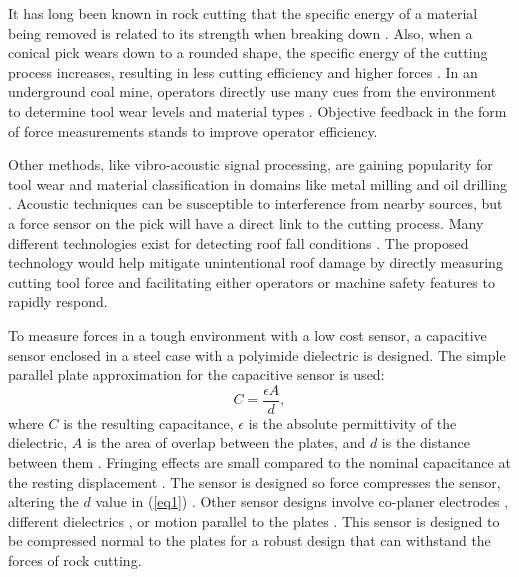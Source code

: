 It has long been known in rock cutting that the specific energy of a material being removed 
is related to its strength when breaking down \cite{TEALE196557}.
Also, when a conical pick wears down to a rounded shape, the specific energy of the cutting process
increases, resulting in less cutting efficiency and higher forces \cite{Zeng2021}.
In an underground coal mine, operators directly use many cues 
from the environment to determine tool wear levels and material types \cite{Bartels2009}.
Objective feedback in the form of force measurements stands to improve operator efficiency.

Other methods, like vibro-acoustic signal processing, 
are gaining popularity for tool wear and material classification 
in domains like metal milling \cite{Cooper2020} and oil drilling \cite{Wang2023}.
Acoustic techniques can be susceptible to interference from nearby sources, 
but a force sensor on the pick will have a direct link to the cutting process.
Many different technologies exist for detecting 
roof fall conditions \cite{en15218312, SLAKER201783, alzahrani2017detection}.
The proposed technology would help mitigate unintentional roof damage by directly measuring
cutting tool force and facilitating either operators or machine safety features
to rapidly respond.

To measure forces in a tough environment with a low cost sensor, 
a capacitive sensor enclosed in a steel case with a polyimide dielectric is designed. 
The simple parallel plate approximation for the capacitive sensor is used:
\begin{equation}
\label{eq1}
C = \frac{\epsilon A}{d},
\end{equation}
where $C$ is the resulting capacitance, $\epsilon$ is the absolute permittivity of the dielectric, 
$A$ is the area of overlap between the plates, and $d$ is the distance between them \cite{HyperPhysics}. 
Fringing effects are small compared to the nominal capacitance at the resting displacement \cite{Reichert2020}.
The sensor is designed so force compresses the sensor, altering the $d$ value in (\ref{eq1}) \cite{Dobrzynska2012, Zhu2020}. 
Other sensor designs involve co-planer electrodes \cite{Lu2016, Zaitsev2017, Barile2019}, different dielectrics \cite{Nelu2019},
or motion parallel to the plates \cite{Kim2005, Liu2016, Prit2019}.
This sensor is designed to be compressed normal to the plates for a robust design that 
can withstand the forces of rock cutting.

